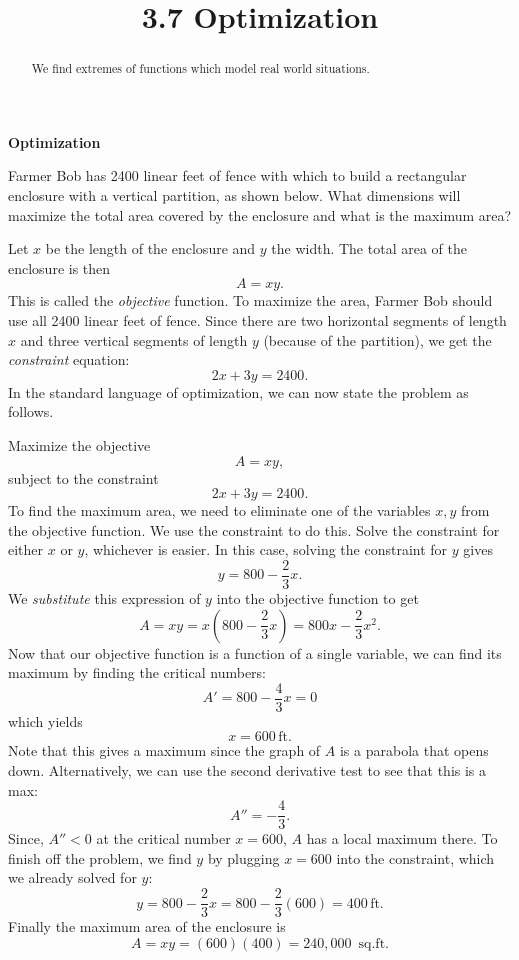 \documentclass{ximera}
\title{3.7 Optimization}
\begin{document}
\begin{abstract}
We find extremes of functions which model real world situations.
\end{abstract}

\maketitle

\begin{center}
\textbf{Optimization}
\end{center}
 

\begin{example}[example 1]
Farmer Bob has 2400 linear feet of fence with which to build a rectangular enclosure with a vertical partition, as shown below.  
What dimensions will maximize the total area covered by the enclosure and what is the maximum area?
\begin{center}
\end{center}
Let $x$ be the length of the enclosure and $y$ the width.  The total area of the enclosure is then
\[A= xy.\]
This is called the {\it objective} function.
To maximize the area, Farmer Bob should use all 2400 linear feet of fence.  Since there are two horizontal segments of length $x$ and three vertical segments of length $y$ (because of the partition), we get the {\it constraint} equation:
\[2x+3y=2400.\]
In the standard language of optimization, we can now state the problem as follows.

Maximize the objective
\[A = xy,\]
subject to the constraint 
\[2x+3y = 2400.\]
To find the maximum area, we need to eliminate one of the variables $x, y$ from the objective function.
We use the constraint to do this.  Solve the constraint for either $x$ or $y$, whichever is easier.
In this case, solving the constraint for $y$ gives
\[y = 800 - \frac23 x.\]
We {\it substitute} this expression of $y$ into the objective function to get 
\[A = xy = x(800 - \frac23 x) = 800x - \frac23 x^2.\]
Now that our objective function is a function of a single variable, we can find its maximum by finding the critical numbers:
\[A' = 800 - \frac43 x = 0 \]
which yields
\[x= 600 \,\mbox{ft.}\]
Note that this gives a maximum since the graph of $A$ is a parabola that opens down. 
Alternatively, we can use the second derivative test to see that this is a max:
\[
A'' = -\frac43.
\]
Since, $A'' < 0$ at the critical number $x = 600$, $A$ has a local maximum there.
To finish off the problem, we find $y$ by plugging $x = 600$ into the constraint, which we already solved for $y$:
\[y = 800 - \frac23 x = 800 - \frac23(600) = 400 \,\mbox{ft.}\]
Finally the maximum area of the enclosure is
\[A = xy = (600)(400) = 240{,}000 \,\mbox{ sq.ft.}\]
\end{example}
\end{document}
